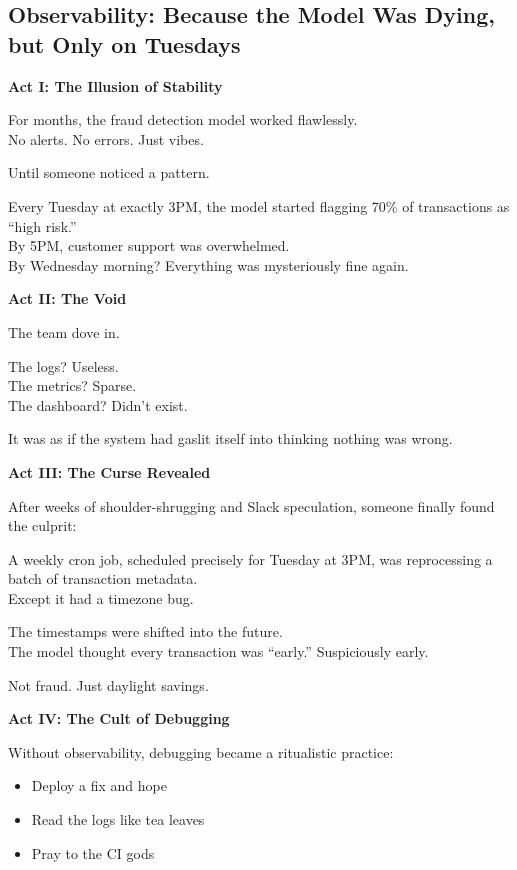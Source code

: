 \subsection{Observability: Because the Model Was Dying, but Only on Tuesdays}

\textbf{Act I: The Illusion of Stability}

For months, the fraud detection model worked flawlessly.\\
No alerts. No errors. Just vibes.

Until someone noticed a pattern.

Every Tuesday at exactly 3PM, the model started flagging 70\% of transactions as ``high risk.''\\
By 5PM, customer support was overwhelmed.\\
By Wednesday morning? Everything was mysteriously fine again.

\vspace{1em}
\textbf{Act II: The Void}

The team dove in.

The logs? Useless.\\
The metrics? Sparse.\\
The dashboard? Didn't exist.

It was as if the system had gaslit itself into thinking nothing was wrong.

\vspace{1em}
\textbf{Act III: The Curse Revealed}

After weeks of shoulder-shrugging and Slack speculation, someone finally found the culprit:

A weekly cron job, scheduled precisely for Tuesday at 3PM, was reprocessing a batch of transaction metadata.\\
Except it had a timezone bug.

The timestamps were shifted into the future.\\
The model thought every transaction was ``early.'' Suspiciously early.

Not fraud. Just daylight savings.

\vspace{1em}
\textbf{Act IV: The Cult of Debugging}

Without observability, debugging became a ritualistic practice:
\begin{itemize}
    \item Deploy a fix and hope
    \item Read the logs like tea leaves
    \item Pray to the CI gods
\end{itemize}

